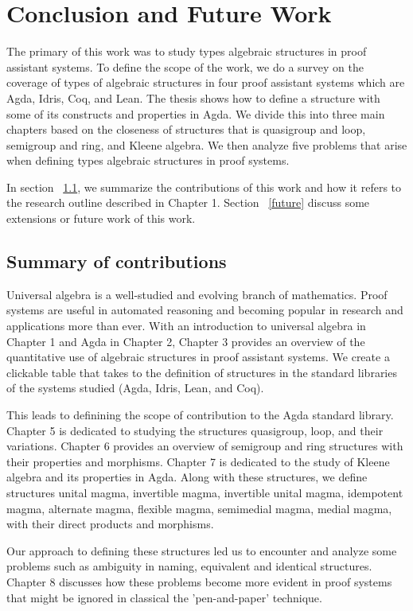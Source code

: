 \chapter{Conclusion and Future Work}
The primary of this work was to study types algebraic structures in proof
assistant systems. To define the scope of the work, we do a survey on the
coverage of types of algebraic structures in four proof assistant systems which
are Agda, Idris, Coq, and Lean. The thesis shows how to define a structure with
some of its constructs and properties in Agda. We divide this into three main
chapters based on the closeness of structures that is quasigroup and loop,
semigroup and ring, and Kleene algebra. We then analyze five problems that arise
when defining types algebraic structures in proof systems.

In section ~\ref{contribution}, we summarize the contributions of this work and
how it refers to the research outline described in Chapter 1. Section
~\ref{future} discuss some extensions or future work of this work. 

\section{Summary of contributions}
\label{contribution}
Universal algebra is a well-studied and evolving branch of mathematics. Proof
systems are useful in automated reasoning and becoming popular in research and
applications more than ever. With an introduction to universal algebra in
Chapter 1 and Agda in Chapter 2, Chapter 3 provides an overview of the
quantitative use of algebraic structures in proof assistant systems. We create a
clickable table that takes to the definition of structures in the standard
libraries of the systems studied (Agda, Idris, Lean, and Coq).

This leads to definining the scope of contribution to the Agda standard library.
Chapter 5 is dedicated to studying the structures quasigroup, loop, and their
variations. Chapter 6 provides an overview of semigroup and ring structures with
their properties and morphisms. Chapter 7 is dedicated to the study of Kleene
algebra and its properties in Agda. Along with these structures, we define
structures unital magma, invertible magma, invertible unital magma, idempotent
magma, alternate magma, flexible magma, semimedial magma, medial magma, with
their direct products and morphisms.

Our approach to defining these structures led us to encounter and analyze some
problems such as ambiguity in naming, equivalent and identical structures.
Chapter 8 discusses how these problems become more evident in proof systems that
might be ignored in classical the 'pen-and-paper' technique.

